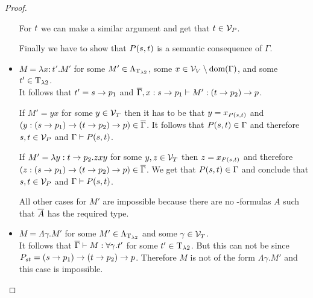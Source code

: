 \begin{proof}
\begin{itemize}
		For $\predTSnd$ we can make a similar argument and get that $\predTSnd\in\VarP$.
		
		Finally we have to show that $P(\predTFst,\predTSnd)$ is a semantic consequence of $\Gamma$.
		
		\begin{figure}[H]
			\centering
			
		\end{figure}
		
	\item[] \underline{$M=\lambda x:t'.M'$} for some $M'\in\Lambda_{\text{T}_{\lambda2}}$, some $x\in\mathcal{V}_V\setminus\text{dom}(\Gamma)$, and some $t'\in\text{T}_{\lambda2}$.\\
		It follows that $t'=\predTFst\to p_1$ and $\trans{\Gamma},x:\predTFst\to p_1\lambdaModels M':(\predTSnd\to p_2)\to p$.
		
		If $M'=yx$ for some $y\in\mathcal{V}_T$ then it has to be that $y=x_{P(\predTFst,\predTSnd)}$ and $(y:(\predTFst\to p_1)\to(\predTSnd\to p_2)\to p)\in\trans{\Gamma}$. It follows that $P(\predTFst,\predTSnd)\in\Gamma$ and therefore $\predTFst,\predTSnd\in\VarP$ and $\Gamma\PModels P(\predTFst,\predTSnd)$.
		
		If $M'=\lambda y:\predTSnd\to p_2.zxy$ for some $y,z\in\mathcal{V}_T$ then $z=x_{P(\predTFst,\predTSnd)}$ and therefore $(z:(\predTFst\to p_1)\to(\predTSnd\to p_2)\to p)\in\trans{\Gamma}$. We get that $P(\predTFst,\predTSnd)\in\Gamma$ and conclude that $\predTFst,\predTSnd\in\VarP$ and $\Gamma\PModels P(\predTFst,\predTSnd)$.
		
		All other cases for $M'$ are impossible because there are no \SysP-formulas $A$ such that $\overline{A}$ has the required type. 
	\item[] \underline{$M=\Lambda\gamma.M'$} for some $M'\in\Lambda_{\text{T}_{\lambda2}}$ and some $\gamma\in\mathcal{V}_T$.\\ %
		It follows that $\overline{\Gamma}\vdash M:\forall\gamma.t'$ for some $t'\in\text{T}_{\lambda2}$.
		But this can not be since $\code{P}{\predTFst}{\predTSnd}=(\predTFst\to p_1)\to(\predTSnd\to p_2)\to p$. Therefore $M$ is not of the form $\Lambda\gamma.M'$ and this case is impossible.


\end{itemize}
\end{proof}
